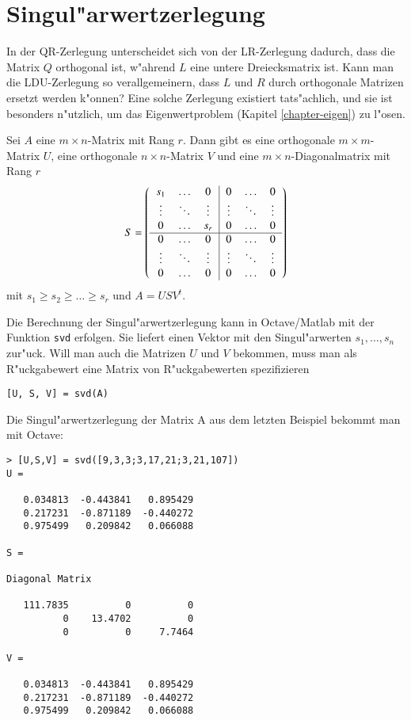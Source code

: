 \section{Singul"arwertzerlegung\label{section-svd}}
In der QR-Zerlegung unterscheidet sich von der LR-Zerlegung
dadurch, dass die Matrix $Q$ orthogonal ist, w"ahrend $L$ eine
untere Dreiecksmatrix ist.
Kann man die LDU-Zerlegung so verallgemeinern,
dass $L$ und $R$ durch orthogonale Matrizen ersetzt
werden k"onnen?  Eine solche Zerlegung existiert tats"achlich,
und sie ist besonders n"utzlich, um das Eigenwertproblem
(Kapitel \ref{chapter-eigen}) zu l"osen.

\begin{satz}\label{satz-svd}
Sei $A$ eine $m\times n$-Matrix mit Rang $r$.
Dann gibt es eine orthogonale $m\times m$-Matrix $U$, eine
orthogonale $n\times n$-Matrix $V$ und eine $m\times n$-Diagonalmatrix
mit Rang $r$ 
\[
S=\left(
\begin{tabular}{>{$}c<{$}>{$}c<{$}>{$}c<{$}|>{$}c<{$}>{$}c<{$}>{$}c<{$}}
s_1   &\dots &0     &0     &\dots &0\\
\vdots&\ddots&\vdots&\vdots&\ddots&\vdots\\
0     &\dots &s_r   &0     &\dots &0\\
\hline
0     &\dots &0     &0     &\dots &0\\
\vdots&\ddots&\vdots&\vdots&\ddots&\vdots\\
0     &\dots &0     &0     &\dots &0\\
\end{tabular}
\right)
\]
mit $s_1\ge s_2\ge\dots \ge s_r$ und $A=USV^t$.
\end{satz}

Die Berechnung der Singul"arwertzerlegung kann in Octave/Matlab
mit der Funktion {\tt svd} erfolgen. Sie liefert einen Vektor
mit den Singul"arwerten $s_1,\dots,s_n$ zur"uck. Will man auch die
Matrizen $U$ und $V$ bekommen, muss man als R"uckgabewert eine
Matrix von R"uckgabewerten spezifizieren
\begin{verbatim}
[U, S, V] = svd(A)
\end{verbatim}

\begin{beispiel}
Die Singul"arwertzerlegung der Matrix A aus dem letzten Beispiel 
bekommt man mit Octave:
\begin{verbatim}
> [U,S,V] = svd([9,3,3;3,17,21;3,21,107])
U =

   0.034813  -0.443841   0.895429
   0.217231  -0.871189  -0.440272
   0.975499   0.209842   0.066088

S =

Diagonal Matrix

   111.7835          0          0
          0    13.4702          0
          0          0     7.7464

V =

   0.034813  -0.443841   0.895429
   0.217231  -0.871189  -0.440272
   0.975499   0.209842   0.066088
\end{verbatim}
\end{beispiel}
